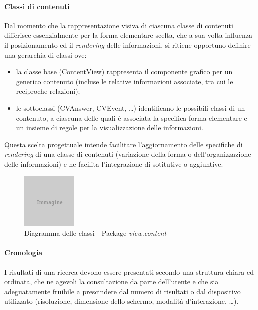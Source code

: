 \paragraph{Classi di contenuti}
Dal momento che la rappresentazione visiva di ciascuna classe di contenuti differisce essenzialmente per la forma elementare scelta, che a sua volta influenza il posizionamento ed il \textit{rendering} delle informazioni, si ritiene opportuno definire una gerarchia di classi ove:
\begin{itemize}
  \item la classe base (\textsf{ContentView}) rappresenta il componente grafico per un generico contenuto (incluse le relative informazioni associate, tra cui le reciproche relazioni);
  \item le sottoclassi (\textsf{CVAnswer}, \textsf{CVEvent}, \ldots) identificano le possibili classi di un contenuto, a ciascuna delle quali è associata la specifica forma elementare e un insieme di regole per la visualizzazione delle informazioni.
\end{itemize}
Questa scelta progettuale intende facilitare l'aggiornamento delle specifiche di \textit{rendering} di una classe di contenuti (variazione della forma o dell'organizzazione delle informazioni) e ne facilita l'integrazione di sotitutive o aggiuntive.

\begin{figure}[ht]
	\begin{center}
		\includegraphics{placeholder.png}
		\caption{Diagramma delle classi - Package \textit{view.content}}
		\label{fig:tesi:stage:design:view-content-classi}
	\end{center}
\end{figure}
 
\paragraph{Cronologia}
I risultati di una ricerca devono essere presentati secondo una struttura chiara ed ordinata, che ne agevoli la consultazione da parte dell'utente e che sia adeguatamente fruibile a prescindere dal numero di risultati o dal dispositivo utilizzato (risoluzione, dimensione dello schermo, modalità d'interazione, \ldots).

